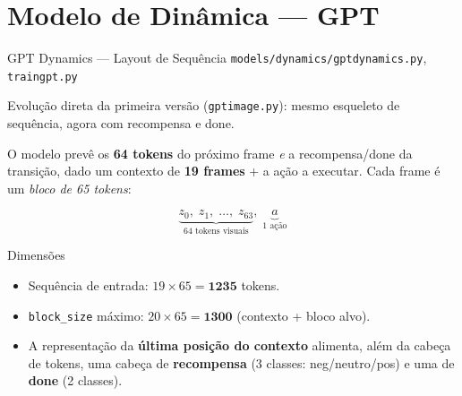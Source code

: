 \documentclass[11pt,aspectratio=169]{beamer}
\begin{document}
\section{Modelo de Dinâmica --- GPT}

\begin{frame}{GPT Dynamics --- Layout de Sequência}
  \small\texttt{models/dynamics/gptdynamics.py}, \texttt{traingpt.py}
  \medskip

  Evolução direta da primeira versão (\texttt{gptimage.py}): mesmo esqueleto
  de sequência, agora com recompensa e done.
  \medskip

  O modelo prevê os \textbf{64 tokens} do próximo frame \emph{e} a
  recompensa/done da transição, dado um contexto de \textbf{19 frames} + a
  ação a executar. Cada frame é um \emph{bloco de 65 tokens}:
  \medskip

  \[
    \underbrace{z_0,\; z_1,\; \ldots,\; z_{63}}_{64\text{ tokens visuais}},\;
    \underbrace{a}_{1\text{ ação}}
  \]

  \medskip
  \begin{block}{Dimensões}
    \begin{itemize}
      \item Sequência de entrada: $19 \times 65 = \mathbf{1235}$ tokens.
      \item \texttt{block\_size} máximo: $20 \times 65 = \mathbf{1300}$
            (contexto + bloco alvo).
      \item A representação da \textbf{última posição do contexto} alimenta,
            além da cabeça de tokens, uma cabeça de \textbf{recompensa}
            (3 classes: neg/neutro/pos) e uma de \textbf{done} (2 classes).
    \end{itemize}
  \end{block}
\end{frame}
\end{document}
